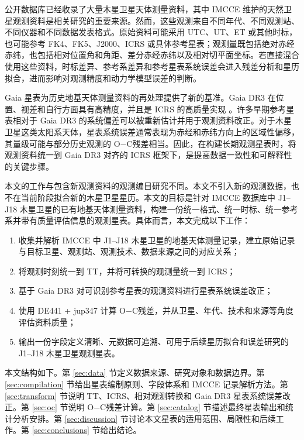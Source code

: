 \documentclass{aastex701}
\newcommand{\oc}{O$-$C}
\begin{document}
公开数据库已经收录了大量木星卫星天体测量资料，其中 IMCCE 维护的天然卫星观测资料是相关研究的重要来源。然而，这些观测来自不同年代、不同观测站、不同仪器和不同数据发表格式。原始资料可能采用 UTC、UT、ET 或其他时标，也可能参考 FK4、FK5、J2000、ICRS 或具体参考星表；观测量既包括绝对赤经赤纬，也包括相对位置角和角距、差分赤经赤纬以及相对切平面坐标。若直接混合使用这些资料，时标差异、参考系差异和参考星表系统误差会进入残差分析和星历拟合，进而影响对观测精度和动力学模型误差的判断。

Gaia 星表为历史地基天体测量资料的再处理提供了新的基准。Gaia DR3 在位置、视差和自行方面具有高精度，并且是 ICRS 的高质量实现 \citep{GaiaDR3}。许多早期参考星表相对于 Gaia DR3 的系统偏差可以被重新估计并用于观测资料改正。对于木星卫星这类太阳系天体，星表系统误差通常表现为赤经和赤纬方向上的区域性偏移，其量级可能与部分历史观测的 \oc 残差相当。因此，在构建长期观测星表时，将观测资料统一到 Gaia DR3 对齐的 ICRS 框架下，是提高数据一致性和可解释性的关键步骤。

本文的工作与包含新观测资料的观测编目研究不同。本文不引入新的观测数据，也不在当前阶段拟合新的木星卫星星历。本文的目标是针对 IMCCE 数据库中 J1--J18 木星卫星的已有地基天体测量资料，构建一份统一格式、统一时标、统一参考系并带有质量评估信息的观测星表。具体而言，本文完成以下工作：

\begin{enumerate}
    \item 收集并解析 IMCCE 中 J1--J18 木星卫星的地基天体测量记录，建立原始记录与目标卫星、观测站、观测技术、数据来源之间的对应关系；
    \item 将观测时刻统一到 TT，并将可转换的观测量统一到 ICRS；
    \item 基于 Gaia DR3 对可识别参考星表的观测资料进行星表系统误差改正；
    \item 使用 DE441 + jup347 计算 \oc 残差，并从卫星、年代、技术和来源等角度评估资料质量；
    \item 输出一份字段定义清晰、元数据可追溯、可用于后续星历拟合和误差研究的 J1--J18 木星卫星观测星表。
\end{enumerate}

本文结构如下。第 \ref{sec:data} 节定义数据来源、研究对象和数据边界。第 \ref{sec:compilation} 节给出星表编制原则、字段体系和 IMCCE 记录解析方法。第 \ref{sec:transform} 节说明 TT、ICRS、相对观测转换和 Gaia DR3 星表系统误差改正。第 \ref{sec:oc} 节说明 \oc 残差计算。第 \ref{sec:catalog} 节描述最终星表输出和统计分析安排。第 \ref{sec:discussion} 节讨论本文星表的适用范围、局限性和后续工作。第 \ref{sec:conclusions} 节给出结论。
\end{document}
